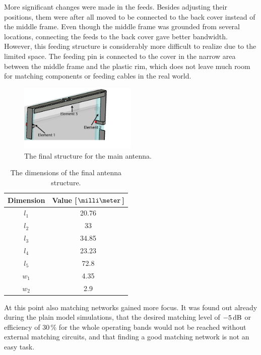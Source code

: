More significant changes were made in the feeds. Besides adjusting their positions, them were after all moved to be connected to the back cover instead of the middle frame. Even though the middle frame was grounded from several locations, connecting the feeds to the back cover gave better bandwidth. However, this feeding structure is considerably more difficult to realize due to the limited space. The feeding pin is connected to the cover in the narrow area between the middle frame and the plastic rim, which does not leave much room for matching components or feeding cables in the real world.

\begin{figure}[H]
    \centering
    \includegraphics[width=0.5\textwidth]{img/main_final.eps}
    \caption{The final structure for the main antenna.}
    \label{fig:main_final}
\end{figure}
\begin{table}[H]
    \centering
    \caption{The dimensions of the final antenna structure.}
    \label{tab:main_final}
    \begin{tabular}{|c|c|}
        \hline
        \textbf{Dimension} & \textbf{Value [$\milli\meter$]}\\
        \hline
        $l_1$ & 20.76 \\
        \hline
        $l_2$ & 33\\
        \hline
        $l_3$ & 34.85 \\
        \hline
        $l_4$ & 23.23 \\
        \hline
        $l_5$ & 72.8 \\
        \hline
        $w_1$ & 4.35\\
        \hline
        $w_2$ & 2.9\\
        \hline
    \end{tabular}
\end{table}


At this point also matching networks gained more focus. It was found out already during the plain model simulations, that the desired matching level of $-5\,\mathrm{dB}$ or efficiency of $30\,\%$ for the whole operating bands would not be reached without external matching circuits, and that finding a good matching network is not an easy task.

